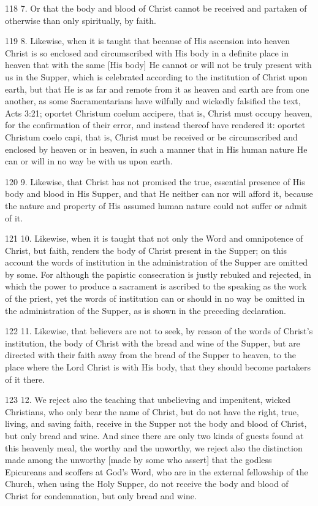 118 7. Or that the body and blood of Christ cannot be received and partaken of otherwise than only spiritually, by faith.

119 8. Likewise, when it is taught that because of His ascension into heaven Christ is so enclosed and circumscribed with His body in a definite place in heaven that with the same [His body] He cannot or will not be truly present with us in the Supper, which is celebrated according to the institution of Christ upon earth, but that He is as far and remote from it as heaven and earth are from one another, as some Sacramentarians have wilfully and wickedly falsified the text, Acts 3:21; oportet Christum coelum accipere, that is, Christ must occupy heaven, for the confirmation of their error, and instead thereof have rendered it: oportet Christum coelo capi, that is, Christ must be received or be circumscribed and enclosed by heaven or in heaven, in such a manner that in His human nature He can or will in no way be with us upon earth.

120 9. Likewise, that Christ has not promised the true, essential presence of His body and blood in His Supper, and that He neither can nor will afford it, because the nature and property of His assumed human nature could not suffer or admit of it.

121 10. Likewise, when it is taught that not only the Word and omnipotence of Christ, but faith, renders the body of Christ present in the Supper; on this account the words of institution in the administration of the Supper are omitted by some. For although the papistic consecration is justly rebuked and rejected, in which the power to produce a sacrament is ascribed to the speaking as the work of the priest, yet the words of institution can or should in no way be omitted in the administration of the Supper, as is shown in the preceding declaration.

122 11. Likewise, that believers are not to seek, by reason of the words of Christ’s institution, the body of Christ with the bread and wine of the Supper, but are directed with their faith away from the bread of the Supper to heaven, to the place where the Lord Christ is with His body, that they should become partakers of it there.

123 12. We reject also the teaching that unbelieving and impenitent, wicked Christians, who only bear the name of Christ, but do not have the right, true, living, and saving faith, receive in the Supper not the body and blood of Christ, but only bread and wine. And since there are only two kinds of guests found at this heavenly meal, the worthy and the unworthy, we reject also the distinction made among the unworthy [made by some who assert] that the godless Epicureans and scoffers at God’s Word, who are in the external fellowship of the Church, when using the Holy Supper, do not receive the body and blood of Christ for condemnation, but only bread and wine.

